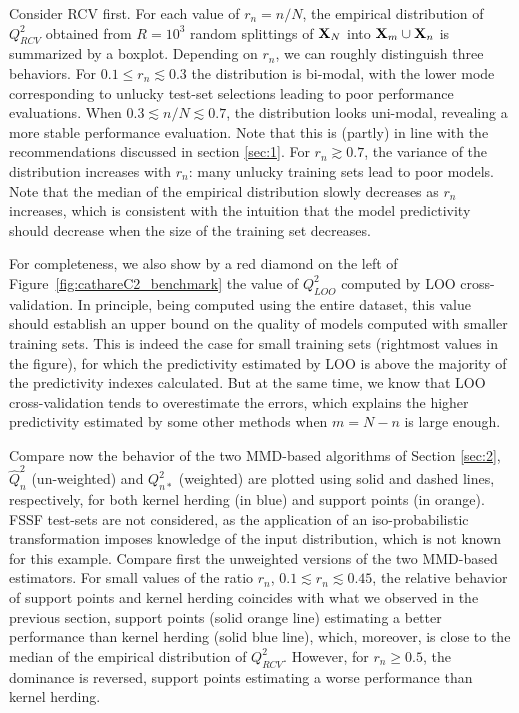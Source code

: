 Consider RCV first. For each value of $r_n=n/N$, the empirical distribution of $Q^2_{RCV}$ obtained from $R=10^3$ random splittings of ${\bf X}_N$ into ${\bf X}_m\cup{\bf X}_n$ is summarized by a boxplot. 
Depending on $r_n$, we can roughly distinguish three behaviors. 
For $0.1 \leq r_n \lesssim 0.3$ the distribution is bi-modal, with the lower mode corresponding to unlucky test-set selections leading to poor performance evaluations. 
When $0.3 \lesssim n/N \lesssim 0.7$, the distribution looks uni-modal, revealing a more stable performance evaluation. 
Note that this is (partly) in line with the recommendations discussed in section \ref{sec:1}. 
For $r_n \gtrsim 0.7$, the variance of the distribution increases with $r_n$: many unlucky training sets lead to poor models. 
Note that the median of the empirical distribution slowly decreases as $r_n$ increases, which is consistent with the intuition that the model predictivity should decrease when the size of the training set decreases. 

For completeness, we also show by a red diamond on the left of Figure~\ref{fig:cathareC2_benchmark} the value of $Q^2_{LOO}$ computed by LOO cross-validation. 
In principle, being computed using the entire dataset, this value should establish an upper bound on the quality of models computed with smaller training sets. 
This is indeed the case for small training sets (rightmost values in the figure), for which the predictivity estimated by LOO is above the majority of the predictivity indexes calculated. 
But at the same time, we know that LOO cross-validation tends to overestimate the errors, which explains the higher predictivity estimated by some other methods when $m=N-n$ is large enough.

Compare now the behavior of the two MMD-based algorithms of Section \ref{sec:2}, $\widehat Q^2_n$ (un-weighted) and $Q_{n*}^2$ (weighted) are plotted using solid and dashed lines, respectively, for both kernel herding (in blue) and support points (in orange). 
FSSF test-sets are not considered, as the application of an iso-probabilistic transformation imposes knowledge of the input distribution, which is not known for this example. 
Compare first the unweighted versions of the two MMD-based estimators. 
For small values of the ratio $r_n$, $0.1 \lesssim r_n \lesssim 0.45$, the relative behavior of support points and kernel herding coincides with what we observed in the previous section, support points (solid orange line) estimating a better performance than kernel herding (solid blue line), which, moreover, is close to the median of the empirical distribution of $Q^2_{RCV}$. 
However, for $r_n \geq 0.5$, the dominance is reversed, support points estimating a worse performance than kernel herding. 

